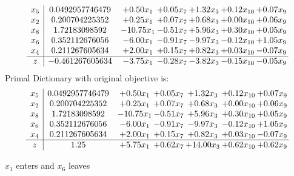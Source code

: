 \documentclass[8pt]{article}
\begin{document}
\[\begin{array}{c| c c@{\hskip 2pt} c@{\hskip 2pt} c@{\hskip 2pt} c@{\hskip 2pt} c@{\hskip 2pt} }
 x_{5}   &  0.0492957746479 & +  0.50 x_{1} & +  0.05 x_{7} & +  1.32 x_{3} & +  0.12 x_{10} & +  0.07 x_{9}\\
 x_{2}   &  0.200704225352 & +  0.25 x_{1} & +  0.07 x_{7} & +  0.68 x_{3} & +  0.00 x_{10} & +  0.06 x_{9}\\
 x_{8}   &  1.72183098592 & -10.75 x_{1} & -0.51 x_{7} & +  5.96 x_{3} & +  0.30 x_{10} & +  0.05 x_{9}\\
 x_{6}   &  0.352112676056 & -6.00 x_{1} & -0.91 x_{7} & -9.97 x_{3} & -0.12 x_{10} & +  1.05 x_{9}\\
 x_{4}   &  0.211267605634 & +  2.00 x_{1} & +  0.15 x_{7} & +  0.82 x_{3} & +  0.03 x_{10} & -0.07 x_{9}\\
\hline
z    &  -0.461267605634 & -3.75 x_{1} & -0.28 x_{7} & -3.82 x_{3} & -0.15 x_{10} & -0.05 x_{9}\\
\end{array}\]
Primal Dictionary with original objective is:
\[\begin{array}{c| c c@{\hskip 2pt} c@{\hskip 2pt} c@{\hskip 2pt} c@{\hskip 2pt} c@{\hskip 2pt} }
 x_{5}   &  0.0492957746479 & +  0.50 x_{1} & +  0.05 x_{7} & +  1.32 x_{3} & +  0.12 x_{10} & +  0.07 x_{9}\\
 x_{2}   &  0.200704225352 & +  0.25 x_{1} & +  0.07 x_{7} & +  0.68 x_{3} & +  0.00 x_{10} & +  0.06 x_{9}\\
 x_{8}   &  1.72183098592 & -10.75 x_{1} & -0.51 x_{7} & +  5.96 x_{3} & +  0.30 x_{10} & +  0.05 x_{9}\\
 x_{6}   &  0.352112676056 & -6.00 x_{1} & -0.91 x_{7} & -9.97 x_{3} & -0.12 x_{10} & +  1.05 x_{9}\\
 x_{4}   &  0.211267605634 & +  2.00 x_{1} & +  0.15 x_{7} & +  0.82 x_{3} & +  0.03 x_{10} & -0.07 x_{9}\\
\hline
z    &  1.25 & +  5.75 x_{1} & +  0.62 x_{7} & + 14.00 x_{3} & +  0.62 x_{10} & +  0.62 x_{9}\\
\end{array}\]


 $ x_{1} $ enters and $ x_{6} $ leaves 
\end{document}

